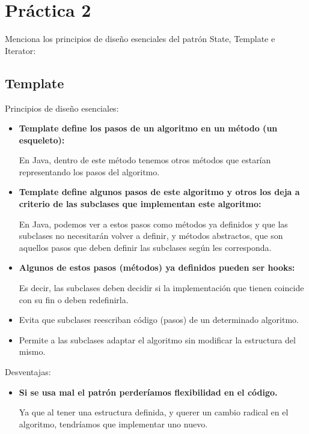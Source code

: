 \documentclass{article}
\begin{document}
	
	\section*{\LARGE{Práctica 2}}

Menciona los principios de diseño esenciales del patrón State, Template e Iterator:

\subsection*{Template}
Principios de diseño esenciales:
\newcommand{\localtextbulletone}{\textcolor{black}{\raisebox{.45ex}{\rule{.6ex}{.6ex}}}}
\renewcommand{\labelitemi}{\localtextbulletone}
\begin{itemize}
\item \textbf{Template define los pasos de un algoritmo en un método (un esqueleto):}
  
  En Java, dentro de este método tenemos otros métodos que estarían representando los
  pasos del algoritmo.
\item \textbf{Template define algunos pasos de este algoritmo y otros los deja a
  criterio de las subclases que implementan este algoritmo:}
  
  En Java, podemos ver a estos pasos como métodos ya definidos y que las subclases no
  necesitarán volver a definir, y métodos abstractos, que son aquellos pasos que deben
  definir las subclases según les corresponda.

\item \textbf{Algunos de estos pasos (métodos) ya definidos pueden ser hooks:}
  
  Es decir, las subclases deben decidir si la implementación que tienen coincide
  con su fin o deben redefinirla.
  
\item Evita que subclases reescriban código (pasos) de un determinado algoritmo.
\item Permite a las subclases adaptar el algoritmo sin modificar la estructura del mismo.
\end{itemize}

Desventajas:
\begin{itemize}
\item \textbf{Si se usa mal el patrón perderíamos flexibilidad en el código.}
  
  Ya que al tener una estructura definida, y querer un cambio radical en el algoritmo,
  tendríamos que implementar uno nuevo.  
\end{itemize}
\end{document}
